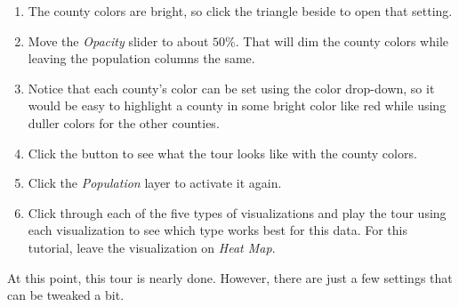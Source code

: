 \begin{enumbox}
\begin{enumerate}
		\item The county colors are bright, so click the triangle beside  to open that setting.
		\item Move the \textit{Opacity} slider to about $ 50\% $. That will dim the county colors while leaving the population columns the same.
		\item Notice that each county's color can be set using the color drop-down, so it would be easy to highlight a county in some bright color like red while using duller colors for the other counties.
		\item Click the  button to see what the tour looks like with the county colors.
		\item Click the \textit{Population} layer to activate it again.
		\item Click through each of the five types of visualizations and play the tour using each visualization to see which type works best for this data. For this tutorial, leave the visualization on \textit{Heat Map}.
	\end{enumerate}
\end{enumbox}

At this point, this tour is nearly done. However, there are just a few settings that can be tweaked a bit.

